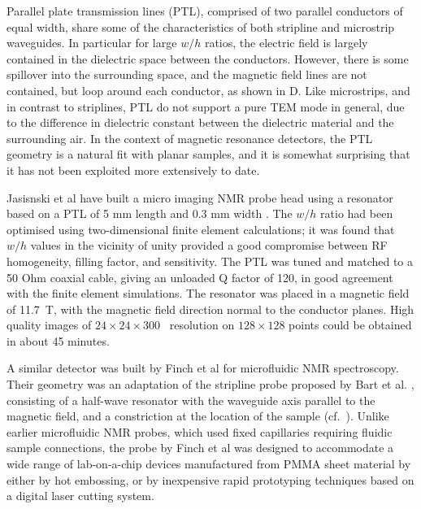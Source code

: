 Parallel plate transmission lines (PTL), comprised of two parallel
conductors of equal width, share some of the characteristics of both
stripline and microstrip waveguides. In particular for large $w/h$ ratios,
the electric field is largely contained in the dielectric space between
the conductors. However, there is some spillover into the surrounding
space, and the magnetic field lines are not contained, but loop around
each conductor, as shown in D. Like microstrips, and in contrast
to striplines, PTL do not support a pure TEM mode in general, due to the
difference in dielectric constant between the dielectric material and
the surrounding air. In the context of magnetic resonance detectors, the
PTL geometry is a natural fit with planar samples, and it is somewhat
surprising that it has not been exploited more extensively to date.

Jasisnski et al have built a micro imaging NMR probe head using a
resonator based on a PTL of 5 mm length and 0.3 mm width
\cite{Jasinski:2012cn}. The $w/h$ ratio had been optimised using
two-dimensional finite element calculations; it was found that $w/h$
values in the vicinity of unity provided a good compromise between RF
homogeneity, filling factor, and sensitivity. The PTL was tuned and
matched to a 50 Ohm coaxial cable, giving an unloaded Q factor of 120,
in good agreement with the finite element simulations. The resonator was
placed in a magnetic field of 11.7~T, with the magnetic field direction
normal to the conductor planes. High quality images of $24 \times 24 \times 300$~
resolution on $128\times 128$ points could be obtained  in
about 45 minutes. 

A similar detector was built by Finch et al
\cite{Finch:2016gv} for microfluidic NMR spectroscopy.
Their geometry was an adaptation of the stripline
probe proposed by Bart et al. \cite{Bart:2009kc}, consisting of a half-wave
resonator with the waveguide axis parallel to the magnetic field, and a
constriction at the location of the sample (cf.~). Unlike earlier
microfluidic NMR probes, which used fixed capillaries requiring
fluidic sample connections, the probe by Finch et al was designed to
accommodate a wide range of lab-on-a-chip devices manufactured from PMMA
sheet material by either by hot embossing, or by inexpensive rapid
prototyping techniques based on a digital laser cutting system. 

